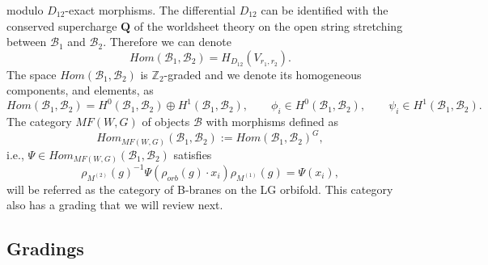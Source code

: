 \documentclass[a4paper,11pt]{article}
\numberwithin{equation}{section}
\begin{document}
modulo $D_{12}$-exact morphisms. The differential $D_{12}$ can be identified 
with the conserved supercharge $\mathbf{Q}$ of the worldsheet theory on the 
open string stretching between $\mathcal{B}_{1}$ and $\mathcal{B}_{2}$. 
Therefore we can denote
\begin{equation}
Hom(\mathcal{B}_{1},\mathcal{B}_{2})=H_{D_{12}}(V_{r_{1},r_{2}}).
\end{equation}
The space $Hom(\mathcal{B}_{1},\mathcal{B}_{2})$ 
is $\mathbb{Z}_{2}$-graded and we denote its homogeneous components, and 
elements, as
\begin{equation}\label{morphismsMF}
Hom(\mathcal{B}_{1},\mathcal{B}_{2})=H^{0}(\mathcal{B}_{1},\mathcal{B}_{2}
)\oplus H^{1}(\mathcal{B}_{1},\mathcal{B}_{2}),\qquad\phi_{i}\in 
H^{0}(\mathcal{B}_{1},\mathcal{B}_{2}),\qquad 
\psi_{i}\in H^{1}(\mathcal{B}_{1},\mathcal{B}_{2}).
\end{equation}
The category $MF(W,G)$ of objects $\mathcal{B}$ with morphisms defined as
\begin{equation}
Hom_{MF(W,G)}(\mathcal{B}_{1},\mathcal{B}_{2}):=Hom(\mathcal{B}_{1},\mathcal{B}_
{2})^{G},
\end{equation}
i.e., $\Psi\in Hom_{MF(W,G)}(\mathcal{B}_{1},\mathcal{B}_{2})$ satisfies
\begin{equation}
\rho_{M^{(2)}}(g)^{-1}\Psi(\rho_{orb}(g)\cdot 
x_{i})\rho_{M^{(1)}}(g)=\Psi( x_{i}),
\end{equation}
will be referred as the category of B-branes on the LG orbifold. This category 
also has a grading that we will review next.

\subsection*{Gradings}
\end{document}
